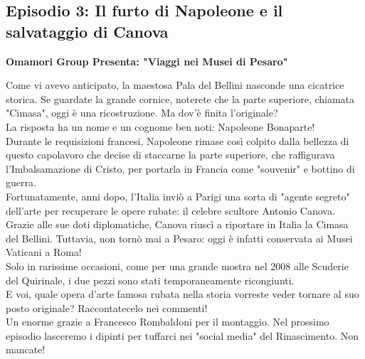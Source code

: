 \documentclass[hidelinks,12pt,a4paper]{article}
\begin{document}
\begin{flushleft}
		\subsection{Episodio 3: Il furto di Napoleone e il salvataggio di Canova}
		\begin{center}
			\textbf{Omamori Group Presenta: "Viaggi nei Musei di Pesaro"}
		\end{center}
		Come vi avevo anticipato, la maestosa Pala del Bellini nasconde una cicatrice storica. Se guardate la grande cornice, noterete che la parte superiore, chiamata "Cimasa", oggi è una ricostruzione. Ma dov'è finita l'originale?\\
		La risposta ha un nome e un cognome ben noti: Napoleone Bonaparte!\\
		Durante le requisizioni francesi, Napoleone rimase così colpito dalla bellezza di questo capolavoro che decise di staccarne la parte superiore, che raffigurava l'Imbalsamazione di Cristo, per portarla in Francia come "souvenir" e bottino di guerra.\\
		Fortunatamente, anni dopo, l'Italia inviò a Parigi una sorta di "agente segreto" dell'arte per recuperare le opere rubate: il celebre scultore Antonio Canova. Grazie alle sue doti diplomatiche, Canova riuscì a riportare in Italia la Cimasa del Bellini. Tuttavia, non tornò mai a Pesaro: oggi è infatti conservata ai Musei Vaticani a Roma!\\
		Solo in rarissime occasioni, come per una grande mostra nel 2008 alle Scuderie del Quirinale, i due pezzi sono stati temporaneamente ricongiunti.\\
		E voi, quale opera d'arte famosa rubata nella storia vorreste veder tornare al suo posto originale? Raccontatecelo nei commenti!\\
		Un enorme grazie a Francesco Rombaldoni per il montaggio. Nel prossimo episodio lasceremo i dipinti per tuffarci nei "social media" del Rinascimento. Non mancate!\\
		

\end{flushleft}
\end{document}
